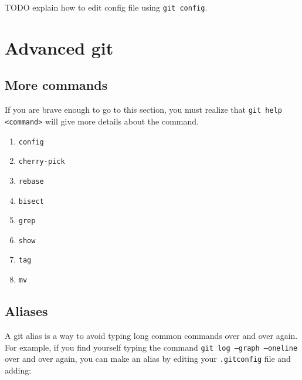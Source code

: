 \documentclass[12pt]{article}
\begin{document}
TODO explain how to edit config file using \texttt{git config}.

\section{Advanced git}

\subsection{More commands}
If you are brave enough to go to this section, you must realize that \texttt{git help <command>} will give more details about the command.

\begin{enumerate}

\item{\texttt{config}}

\item{\texttt{cherry-pick}}

\item{\texttt{rebase}}

\item{\texttt{bisect}}

\item{\texttt{grep}}

\item{\texttt{show}}

\item{\texttt{tag}}

\item{\texttt{mv}}

\end{enumerate}

\subsection{Aliases}
A git alias is a way to avoid typing long common commands over and over again. For example, if you find yourself typing the command \texttt{git log --graph --oneline} over and over again, you can make an alias by editing your \texttt{.gitconfig} file and adding:
\end{document}
